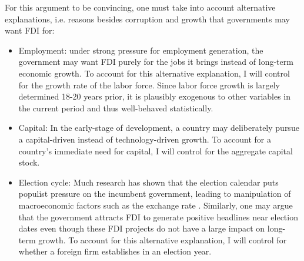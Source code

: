 For this argument to be convincing, one must take into account alternative explanations, i.e. reasons besides corruption and growth that governments may want FDI for:
\begin{itemize} 
\item Employment: under strong pressure for employment generation, the government may want FDI purely for the jobs it brings instead of long-term economic growth. To account for this alternative explanation, I will control for the growth rate of the labor force. Since labor force growth is largely determined 18-20 years prior, it is plausibly exogenous to other variables in the current period and thus well-behaved statistically.  
\item Capital: In the early-stage of development, a country may deliberately pursue a capital-driven instead of technology-driven growth. To account for a country's immediate need for capital, I will control for the aggregate capital stock.
\item Election cycle: Much research has shown that the election calendar puts populist pressure on the incumbent government, leading to manipulation of macroeconomic factors such as the exchange rate \citep{Blomberg2001}. Similarly, one may argue that the government attracts FDI to generate positive headlines near election dates even though these FDI projects do not have a large impact on long-term growth. To account for this alternative explanation, I will control for whether a foreign firm establishes in an election year.
\end{itemize}
